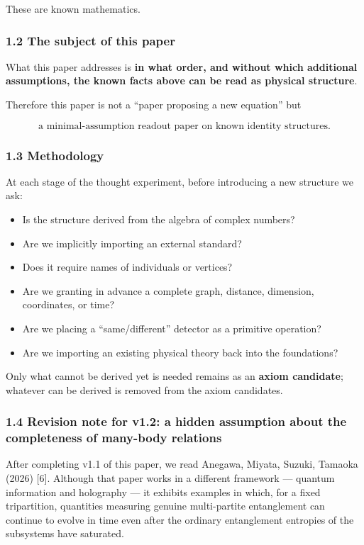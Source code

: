 \documentclass[
  a4paper,
]{article}
\providecommand{\tightlist}{%
  \setlength{\itemsep}{0pt}\setlength{\parskip}{0pt}}
\begin{document}
These are known mathematics.

\subsubsection{1.2 The subject of this
paper}\label{the-subject-of-this-paper}

What this paper addresses is \textbf{in what order, and without which
additional assumptions, the known facts above can be read as physical
structure}.

Therefore this paper is not a ``paper proposing a new equation'' but

\[
\boxed{\text{a minimal-assumption readout paper on known identity structures.}}
\]

\subsubsection{1.3 Methodology}\label{methodology}

At each stage of the thought experiment, before introducing a new
structure we ask:

\begin{itemize}
\tightlist
\item
  Is the structure derived from the algebra of complex numbers?
\item
  Are we implicitly importing an external standard?
\item
  Does it require names of individuals or vertices?
\item
  Are we granting in advance a complete graph, distance, dimension,
  coordinates, or time?
\item
  Are we placing a ``same/different'' detector as a primitive operation?
\item
  Are we importing an existing physical theory back into the
  foundations?
\end{itemize}

Only what cannot be derived yet is needed remains as an \textbf{axiom
candidate}; whatever can be derived is removed from the axiom
candidates.

\subsubsection{1.4 Revision note for v1.2: a hidden assumption about the
completeness of many-body
relations}\label{revision-note-for-v1.2-a-hidden-assumption-about-the-completeness-of-many-body-relations}

After completing v1.1 of this paper, we read Anegawa, Miyata, Suzuki,
Tamaoka (2026) {[}6{]}. Although that paper works in a different
framework --- quantum information and holography --- it exhibits
examples in which, for a fixed tripartition, quantities measuring
genuine multi-partite entanglement can continue to evolve in time even
after the ordinary entanglement entropies of the subsystems have
saturated.
\end{document}
